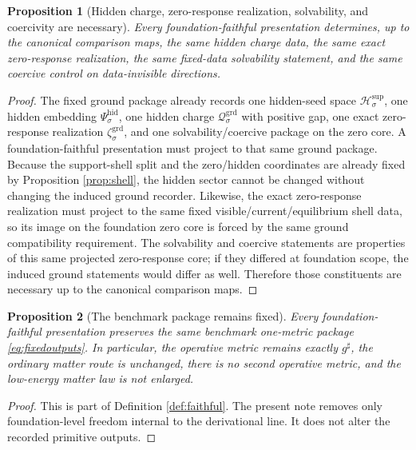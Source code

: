 \documentclass[11pt]{article}
\newcommand{\CompletedMetric}{g^{\sharp}}
\newcommand{\GroundCharge}[1]{\mathcal Q_{#1}^{\mathrm{grd}}}
\newcommand{\GroundEmbed}[1]{\zeta_{#1}^{\mathrm{grd}}}
\newcommand{\SeedHidden}[1]{\mathcal H_{#1}^{\mathrm{sup}}}
\newcommand{\HiddenChart}[1]{\Psi_{#1}^{\mathrm{hid}}}
\newtheorem{proposition}{Proposition}
\begin{document}
\begin{proposition}[Hidden charge, zero-response realization, solvability, and coercivity are necessary]
\label{prop:hidden}
Every foundation-faithful presentation determines, up to the canonical comparison maps, the same hidden charge data, the same exact zero-response realization, the same fixed-data solvability statement, and the same coercive control on data-invisible directions.
\end{proposition}

\begin{proof}
The fixed ground package already records one hidden-seed space \(\SeedHidden{\sigma}\), one hidden embedding \(\HiddenChart{\sigma}\), one hidden charge \(\GroundCharge{\sigma}\) with positive gap, one exact zero-response realization \(\GroundEmbed{\sigma}\), and one solvability/coercive package on the zero core. A foundation-faithful presentation must project to that same ground package. Because the support-shell split and the zero/hidden coordinates are already fixed by Proposition \ref{prop:shell}, the hidden sector cannot be changed without changing the induced ground recorder. Likewise, the exact zero-response realization must project to the same fixed visible/current/equilibrium shell data, so its image on the foundation zero core is forced by the same ground compatibility requirement. The solvability and coercive statements are properties of this same projected zero-response core; if they differed at foundation scope, the induced ground statements would differ as well. Therefore those constituents are necessary up to the canonical comparison maps.
\end{proof}

\begin{proposition}[The benchmark package remains fixed]
\label{prop:benchmark}
Every foundation-faithful presentation preserves the same benchmark one-metric package \eqref{eq:fixedoutputs}. In particular, the operative metric remains exactly \(\CompletedMetric\), the ordinary matter route is unchanged, there is no second operative metric, and the low-energy matter law is not enlarged.
\end{proposition}

\begin{proof}
This is part of Definition \ref{def:faithful}. The present note removes only foundation-level freedom internal to the derivational line. It does not alter the recorded primitive outputs.
\end{proof}
\end{document}
